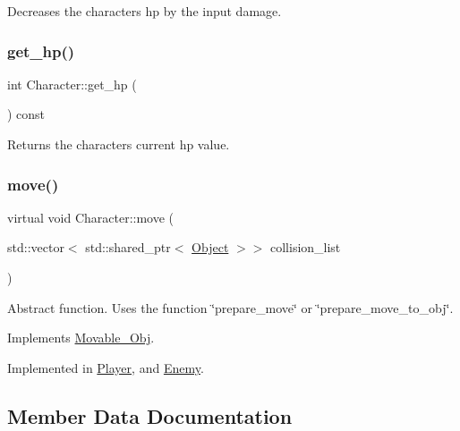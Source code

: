 Decreases the characters hp by the input damage. \mbox{\label{classCharacter_a2505da59bef541d2224af270010d03b5}} 
\subsubsection{\texorpdfstring{get\+\_\+hp()}{get\_hp()}}
{\footnotesize\ttfamily int Character\+::get\+\_\+hp (\begin{DoxyParamCaption}{ }\end{DoxyParamCaption}) const}

Returns the characters current hp value. \mbox{\label{classCharacter_a91211cae08aab6a74b43377e4463283a}} 
\subsubsection{\texorpdfstring{move()}{move()}}
{\footnotesize\ttfamily virtual void Character\+::move (\begin{DoxyParamCaption}\item[{std\+::vector$<$ std\+::shared\+\_\+ptr$<$ \hyperlink{classObject}{Object} $>$$>$}]{collision\+\_\+list }\end{DoxyParamCaption})\hspace{0.3cm}{\ttfamily [pure virtual]}}

Abstract function. Uses the function \char`\"{}prepare\+\_\+move\char`\"{} or \char`\"{}prepare\+\_\+move\+\_\+to\+\_\+obj\char`\"{}. 

Implements \hyperlink{classMovable__Obj_a7bc9fbcd4dede97c2fae66c0502c8ead}{Movable\+\_\+\+Obj}.



Implemented in \hyperlink{classPlayer_ace418f6e52cafc354f57268cfe4b646a}{Player}, and \hyperlink{classEnemy_a8e842aa8ab6c75f2c9d71c6c3f43d88c}{Enemy}.



\subsection{Member Data Documentation}
\mbox{\label{classCharacter_a273353643988a87a0ce03cff3870b2d9}} 
